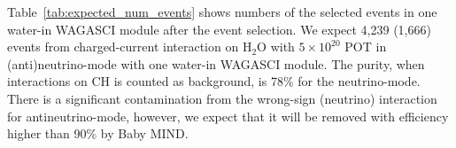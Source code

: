 Table~\ref{tab:expected_num_events}  shows numbers of the selected events in one water-in WAGASCI module after the event selection.
We expect 4,239 (1,666) events from charged-current interaction on $\mathrm{H_2O}$ with $5 \times 10^{20}$  POT in (anti)neutrino-mode with one water-in WAGASCI module.
The purity, when interactions on CH is counted as background, is 78\% for the neutrino-mode.
There is a significant contamination from the wrong-sign (neutrino) interaction for antineutrino-mode, however, we expect that
it will be removed with efficiency higher than 90\% by Baby MIND.

